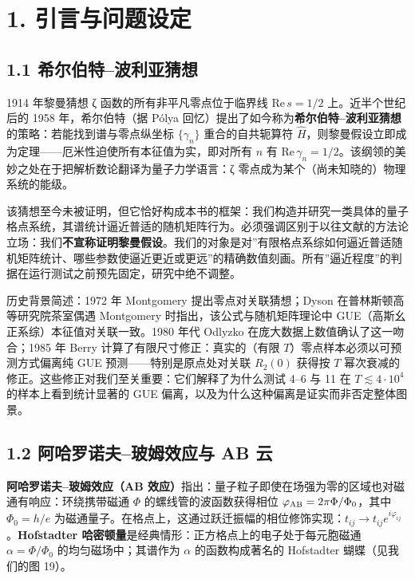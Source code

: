 \documentclass[
]{article}
\begin{document}
\section{1.
引言与问题设定}\label{ux5f15ux8a00ux4e0eux95eeux9898ux8bbeux5b9a}

\subsection{1.1
希尔伯特--波利亚猜想}\label{ux5e0cux5c14ux4f2fux7279ux6ce2ux5229ux4e9aux731cux60f3}

1914 年黎曼猜想 ζ 函数的所有非平凡零点位于临界线
\(\mathrm{Re}\,s = 1/2\) 上。近半个世纪后的 1958 年，希尔伯特（据 Pólya
回忆）提出了如今称为\textbf{希尔伯特--波利亚猜想}的策略：若能找到谱与零点纵坐标
\(\{\gamma_n\}\) 重合的自共轭算符
\(\hat H\)，则黎曼假设立即成为定理------厄米性迫使所有本征值为实，即对所有
\(n\) 有
\(\mathrm{Re}\,\gamma_n = 1/2\)。该纲领的美妙之处在于把解析数论翻译为量子力学语言：ζ
零点成为某个（尚未知晓的）物理系统的能级。

该猜想至今未被证明，但它恰好构成本书的框架：我们构造并研究一类具体的量子格点系统，其谱统计逼近普适的随机矩阵行为。必须强调区别于以往文献的方法论立场：我们\textbf{不宣称证明黎曼假设}。我们的对象是对''有限格点系综如何逼近普适随机矩阵统计、哪些参数使逼近更近或更远''的精确数值刻画。所有''逼近程度''的判据在运行测试之前预先固定，研究中绝不调整。

历史背景简述：1972 年 Montgomery 提出零点对关联猜想；Dyson
在普林斯顿高等研究院茶室偶遇 Montgomery 时指出，该公式与随机矩阵理论中
GUE（高斯幺正系综）本征值对关联一致。1980 年代 Odlyzko
在庞大数据上数值确认了这一吻合；1985 年 Berry
计算了有限尺寸修正：真实的（有限 \(T\)）零点样本必须以可预测方式偏离纯
GUE 预测------特别是原点处对关联 \(R_2(0)\) 获得按 \(T\)
幂次衰减的修正。这些修正对我们至关重要：它们解释了为什么测试 4--6 与 11
在 \(T\lesssim 4\cdot10^4\) 的样本上看到统计显著的 GUE
偏离，以及为什么这种偏离是证实而非否定整体图景。

\subsection{1.2 阿哈罗诺夫--玻姆效应与 AB
云}\label{ux963fux54c8ux7f57ux8bfaux592bux73bbux59c6ux6548ux5e94ux4e0e-ab-ux4e91}

\textbf{阿哈罗诺夫--玻姆效应（AB
效应）}指出：量子粒子即使在场强为零的区域也对磁通有响应：环绕携带磁通
\(\Phi\) 的螺线管的波函数获得相位
\(\varphi_{\rm AB} = 2\pi\Phi/\Phi_0\)，其中 \(\Phi_0 = h/e\)
为磁通量子。在格点上，这通过跃迁振幅的相位修饰实现：\(t_{ij}\to t_{ij}e^{i\varphi_{ij}}\)。\textbf{Hofstadter
哈密顿量}是经典情形：正方格点上的电子处于每元胞磁通
\(\alpha = \Phi/\Phi_0\) 的均匀磁场中；其谱作为 \(\alpha\)
的函数构成著名的 Hofstadter 蝴蝶（见我们的图 19）。
\end{document}
